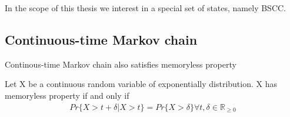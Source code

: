 In the scope of this thesis we interest in a special set of states, namely BSCC.
\begin{definition}

\end{definition}
\begin{definition}

\end{definition}
\begin{definition}

\end{definition}


\subsection{Continuous-time Markov chain}
Continous-time Markov chain also satisfies memoryless property
\begin{definition}
    Let X be a continuous random variable of exponentially distribution. X has memoryless property
    if and only if
    \begin{align*}
        Pr\{X > t + \delta | X > t\} = Pr\{X > \delta\} \forall t,\delta\in\mathbb{R}_{\geq 0}
    \end{align*}
\end{definition}


